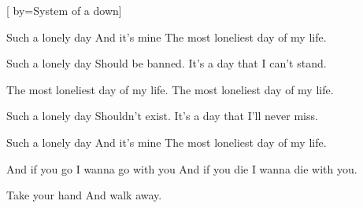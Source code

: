 [
  by={System of a down}]


\bigskip


\bigskip

\beginverse
Such a lonely day 
And it's mine 
The most loneliest day of my life.
\bigskip

Such a lonely day 
Should be banned.
It's a day that I can't stand.
\endverse


\beginchorus
The most loneliest day of my life.
The most loneliest day of my life.
\endchorus


\beginverse
Such a lonely day 
Shouldn't exist.
It's a day that I'll never miss.
\bigskip

Such a lonely day 
And it's mine
The most loneliest day of my life.
\bigskip

And if you go 
I wanna go with you 
And if you die 
I wanna die with you.
\bigskip

Take your hand 
And walk away.
\endverse


\endsong

